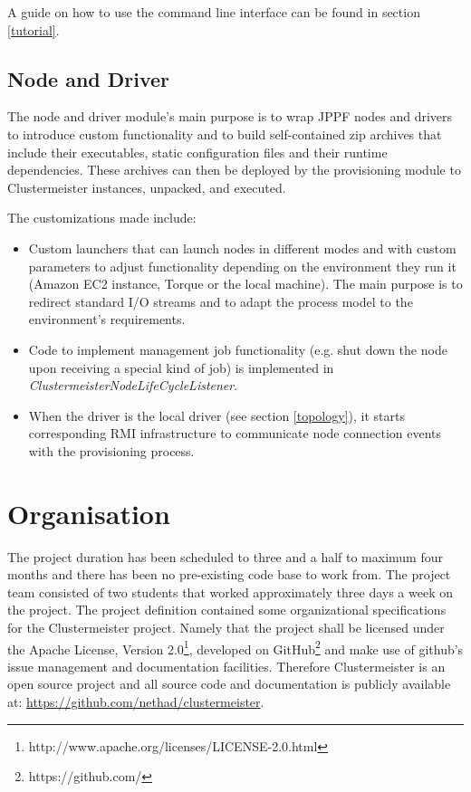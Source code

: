 \documentclass[english]{uzhpub}
\begin{document}
A guide on how to use the command line interface can be found in section \ref{tutorial}.

\subsection{Node and Driver}
The node and driver module's main purpose is to wrap JPPF nodes and drivers to introduce custom functionality and to build self-contained zip archives that include their executables, static configuration files and their runtime dependencies. These archives can then be deployed by the provisioning module to Clustermeister instances, unpacked, and executed.

The customizations made include:

\begin{itemize}
\item Custom launchers that can launch nodes in different modes and with custom parameters to adjust functionality depending on the environment they run it (Amazon EC2 instance, Torque or the local machine). The main purpose is to redirect standard I/O streams and to adapt the process model to the environment's requirements.
\item Code to implement management job functionality (e.g. shut down the node upon receiving a special kind of job) is implemented in \textit{ClustermeisterNodeLifeCycleListener}.
\item When the driver is the local driver (see section \ref{topology}), it starts corresponding RMI infrastructure to communicate node connection events with the provisioning process.
\end{itemize}

\section{Organisation}

The project duration has been scheduled to three and a half to maximum four months and there has been no pre-existing code base to work from. The project team consisted of two students that worked approximately three days a week on the project. The project definition contained some organizational specifications for the Clustermeister project. Namely that the project shall be licensed under the Apache License, Version 2.0\footnote{http://www.apache.org/licenses/LICENSE-2.0.html}, developed on GitHub\footnote{https://github.com/} and make use of github's issue management and documentation facilities. Therefore Clustermeister is an open source project and all source code and documentation is publicly available at: \url{https://github.com/nethad/clustermeister}.
\end{document}
